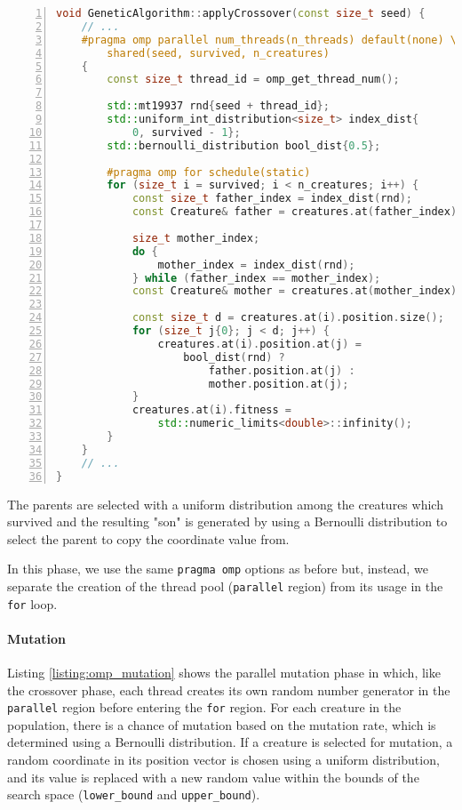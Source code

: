 \documentclass[12pt,a4paper,oneside]{article}
\begin{document}
	\begin{lstlisting}[language=C++,
		directivestyle={\color{black}},
		backgroundcolor=\color{lgrey},
    	basicstyle=\footnotesize \ttfamily \color{black} \bfseries,
		numbers=left,
		numbersep=5pt,
    	numberstyle=\tiny\color{black},
		commentstyle=\color{dkgreen},
    	rulecolor=\color{black},
    	keywordstyle=\color{purple},
    	morekeywords={size_t,std},
		tabsize=2,
    	captionpos=b,
    	caption={Parallel crossover phase in OpenMP.},
    	label={listing:omp_crossover}
	   ]
void GeneticAlgorithm::applyCrossover(const size_t seed) {
	// ...
	#pragma omp parallel num_threads(n_threads) default(none) \
		shared(seed, survived, n_creatures)
	{
		const size_t thread_id = omp_get_thread_num();

		std::mt19937 rnd{seed + thread_id};
		std::uniform_int_distribution<size_t> index_dist{
			0, survived - 1};
		std::bernoulli_distribution bool_dist{0.5};

		#pragma omp for schedule(static)
		for (size_t i = survived; i < n_creatures; i++) {
			const size_t father_index = index_dist(rnd);
			const Creature& father = creatures.at(father_index);

			size_t mother_index;
			do {
				mother_index = index_dist(rnd);
			} while (father_index == mother_index);
			const Creature& mother = creatures.at(mother_index);

			const size_t d = creatures.at(i).position.size();
			for (size_t j{0}; j < d; j++) {
				creatures.at(i).position.at(j) =
					bool_dist(rnd) ?
						father.position.at(j) :
						mother.position.at(j);
			}
			creatures.at(i).fitness =
				std::numeric_limits<double>::infinity();
		}
	}
	// ...
}
	\end{lstlisting}

	The parents are selected with a uniform distribution among the creatures which survived and the resulting "son" is generated by using a Bernoulli distribution to select the parent to copy the coordinate value from.

	In this phase, we use the same \texttt{pragma omp} options as before but, instead, we separate the creation of the thread pool (\texttt{parallel} region) from its usage in the \texttt{for} loop.

	\paragraph{Mutation}
	Listing \ref{listing:omp_mutation} shows the parallel mutation phase in which, like the crossover phase, each thread creates its own random number generator in the \texttt{parallel} region before entering the \texttt{for} region.
	For each creature in the population, there is a chance of mutation based on the mutation rate, which is determined using a Bernoulli distribution. If a creature is selected for mutation, a random coordinate in its position vector is chosen using a uniform distribution, and its value is replaced with a new random value within the bounds of the search space (\texttt{lower\_bound} and \texttt{upper\_bound}).
\end{document}
